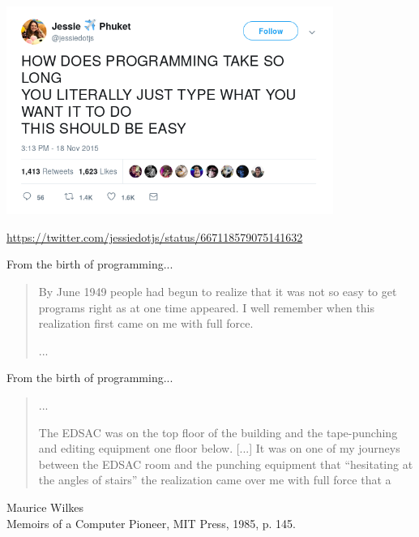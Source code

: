\documentclass[xetex,aspectratio=169,14pt,hyperref={pdfpagelabels=true,pdflang={en-GB}}]{beamer}
\begin{document}
\frame{\titlepage}


\begin{frame}
  \includegraphics[width=0.8\textwidth]{tweet.png}

  {\small\url{https://twitter.com/jessiedotjs/status/667118579075141632}}
\end{frame}

\begin{frame}
  {From the birth of programming...}

  \begin{quotation}
    By June 1949 people had begun to realize that it was not so easy
    to get programs right as at one time appeared. I well remember
    when this realization first came on me with full force.

    ...
  \end{quotation}
\end{frame}

\begin{frame}
  {From the birth of programming...}

  \begin{quotation}
    ...

    The EDSAC was on the top floor of the building and the
    tape-punching and editing equipment one floor below. [...] It was
    on one of my journeys between the EDSAC room and the punching
    equipment that ``hesitating at the angles of stairs'' the
    realization came over me with full force that a 
  \end{quotation}
  Maurice Wilkes\\
  Memoirs of a Computer Pioneer, MIT Press, 1985, p. 145.

\end{frame}
\end{document}
